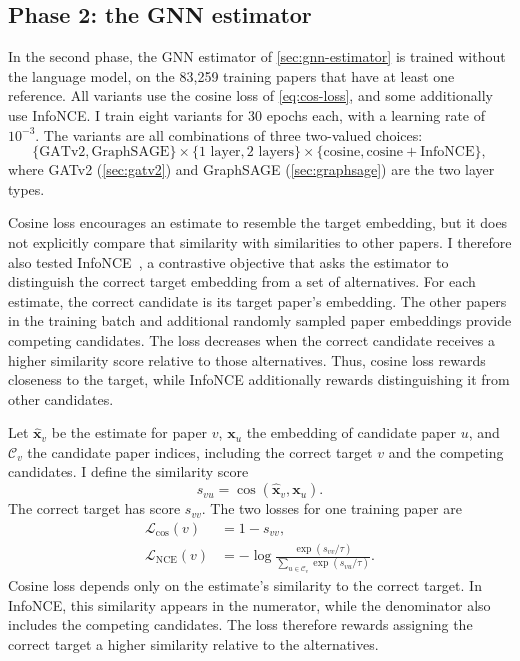 \subsection{Phase 2: the GNN estimator}
\label{sec:training-gnn}

In the second phase, the GNN estimator of \autoref{sec:gnn-estimator} is trained without the language model, on the 83,259 training papers that have at least one reference. All variants use the cosine loss of \autoref{eq:cos-loss}, and some additionally use InfoNCE. I train eight variants for 30 epochs each, with a learning rate of $10^{-3}$. The variants are all combinations of three two-valued choices:
\[
  \{\text{GATv2}, \text{GraphSAGE}\} \times \{\text{1 layer}, \text{2 layers}\} \times \{\text{cosine}, \text{cosine} + \text{InfoNCE}\},
\]
where GATv2 (\autoref{sec:gatv2}) and GraphSAGE (\autoref{sec:graphsage}) are the two layer types.

Cosine loss encourages an estimate to resemble the target embedding, but it does not explicitly compare that similarity with similarities to other papers. I therefore also tested InfoNCE~\cite{oord2018representation}, a contrastive objective that asks the estimator to distinguish the correct target embedding from a set of alternatives. For each estimate, the correct candidate is its target paper's embedding. The other papers in the training batch and additional randomly sampled paper embeddings provide competing candidates. The loss decreases when the correct candidate receives a higher similarity score relative to those alternatives. Thus, cosine loss rewards closeness to the target, while InfoNCE additionally rewards distinguishing it from other candidates.

Let $\hat{\mathbf{x}}_v$ be the estimate for paper $v$, $\mathbf{x}_u$ the embedding of candidate paper $u$, and $\mathcal{C}_v$ the candidate paper indices, including the correct target $v$ and the competing candidates. I define the similarity score
\[
  s_{vu} = \cos(\hat{\mathbf{x}}_v, \mathbf{x}_u).
\]
The correct target has score $s_{vv}$. The two losses for one training paper are
\[
  \begin{aligned}
    \mathcal{L}_{\cos}(v) &= 1 - s_{vv}, \\[4pt]
    \mathcal{L}_{\mathrm{NCE}}(v) &= -\log \frac{\exp(s_{vv}/\tau)}{\displaystyle\sum_{u \in \mathcal{C}_v} \exp(s_{vu}/\tau)}.
  \end{aligned}
\]
Cosine loss depends only on the estimate's similarity to the correct target. In InfoNCE, this similarity appears in the numerator, while the denominator also includes the competing candidates. The loss therefore rewards assigning the correct target a higher similarity relative to the alternatives.

